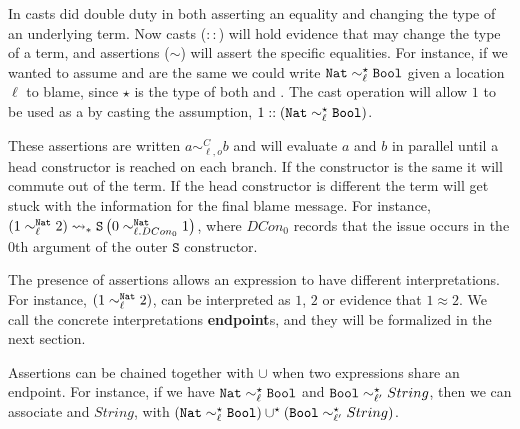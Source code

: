 
In  casts did double duty in both asserting an equality and changing the type of an underlying term.
Now casts ($::$) will hold evidence that may change the type of a term, and assertions ($\sim$) will assert the specific equalities.
For instance, if we wanted to assume \Nat{} and \Bool{} are the same we could write $\mathtt{Nat}{} \sim_{\ell}^{\star}\mathtt{Bool}{} $ given a location $\ell$ to blame, since $\star$ is the type of both \Nat{} and \Bool{}.
The cast operation will allow $1$ to be used as a \Bool{} by casting the assumption, $1::\left(\mathtt{Nat}{} \sim_{\ell}^{\star}\mathtt{Bool}{} \right)$. 

These assertions are written $a\sim_{\ell,o}^{C}b$ and will evaluate $a$ and $b$ in parallel until a head constructor is reached on each branch.
If the constructor is the same it will commute out of the term.
If the head constructor is different the term will get stuck with the information for the final blame message.
For instance, $\left(1 \sim_{\ell}^{\mathtt{Nat}{}} 2 \right)\rightsquigarrow_{*} \mathtt{S}\left(0 \sim_{\ell.DCon_{0}}^{\mathtt{Nat}{}} 1\right) $, where $DCon_{0}$ records that the issue occurs in the 0th argument of the outer $\mathtt{S}$ constructor.


The presence of assertions allows an expression to have different interpretations.
For instance, $\left(1 \sim_{\ell}^{\mathtt{Nat}{}} 2 \right)$, can be interpreted as $1$, $2$ or evidence that $1\approx2$.
We call the concrete interpretations \textbf{endpoint}s, and they will be formalized in the next section.

Assertions can be chained together with $\cup$ when two expressions share an endpoint. %
For instance, if we have $\mathtt{Nat}{} \sim_{\ell}^{\star}\mathtt{Bool}{}$ and $\mathtt{Bool}{} \sim_{\ell'}^{\star}String$, then we can associate \Nat{} and $String$, with $\left(\mathtt{Nat}{} \sim_{\ell}^{\star}\mathtt{Bool}{} \right)\cup^{\star}\left(\mathtt{Bool}{} \sim_{\ell'}^{\star}String\right)$.

